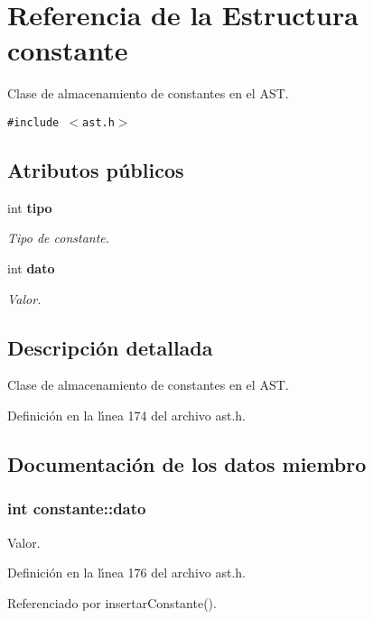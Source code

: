 \section{Referencia de la Estructura constante}
\label{structconstante}
Clase de almacenamiento de constantes en el AST.  


{\tt \#include $<$ast.h$>$}

\subsection*{Atributos p\'{u}blicos}
\begin{CompactItemize}
\item 
int {\bf tipo}
\begin{CompactList}\small\item\em Tipo de constante. \item\end{CompactList}\item 
int {\bf dato}
\begin{CompactList}\small\item\em Valor. \item\end{CompactList}\end{CompactItemize}


\subsection{Descripci\'{o}n detallada}
Clase de almacenamiento de constantes en el AST. 



Definici\'{o}n en la l\'{\i}nea 174 del archivo ast.h.

\subsection{Documentaci\'{o}n de los datos miembro}
\subsubsection{\setlength{\rightskip}{0pt plus 5cm}int {\bf constante::dato}}\label{structconstante_o1}


Valor. 



Definici\'{o}n en la l\'{\i}nea 176 del archivo ast.h.

Referenciado por insertar\-Constante().
